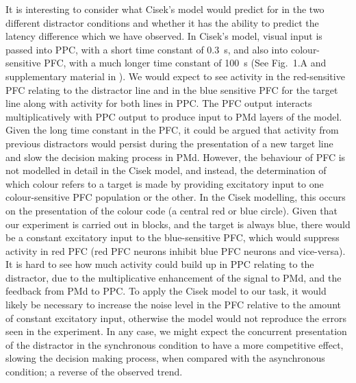 \documentclass[10pt,letterpaper]{article}
\begin{document}
It is interesting to consider what Cisek's model would predict for in
the two different distractor conditions and whether it has the ability
to predict the latency difference which we have observed. In Cisek's
model, visual input is passed into PPC, with a short time constant of
0.3~s, and also into colour-sensitive PFC, with a much longer time
constant of 100~s (See Fig.~1.A and supplementary material in
\cite{cisek_integrated_2006}). We would expect to see activity in the
red-sensitive PFC relating to the distractor line and in the blue
sensitive PFC for the target line along with activity for both lines
in PPC. The PFC output interacts multiplicatively with PPC output to
produce input to PMd layers of the model. Given the long time constant
in the PFC, it could be argued that activity from previous distractors
would persist during the presentation of a new target line and slow
the decision making process in PMd. However, the behaviour of PFC is
not modelled in detail in the Cisek model, and instead, the
determination of which colour refers to a target is made by providing
excitatory input to one colour-sensitive PFC population or the
other. In the Cisek modelling, this occurs on the presentation of the
colour code (a central red or blue circle). Given that our experiment
is carried out in blocks, and the target is always blue, there would
be a constant excitatory input to the blue-sensitive PFC, which would
suppress activity in red PFC (red PFC neurons inhibit blue PFC neurons
and vice-versa). It is hard to see how much activity could build up in
PPC relating to the distractor, due to the multiplicative enhancement
of the signal to PMd, and the feedback from PMd to PPC. To apply the
Cisek model to our task, it would likely be necessary to increase the
noise level in the PFC relative to the amount of constant excitatory
input, otherwise the model would not reproduce the errors seen in the
experiment. In any case, we might expect the concurrent presentation
of the distractor in the synchronous condition to have a more
competitive effect, slowing the decision making process, when compared
with the asynchronous condition; a reverse of the observed trend.
\end{document}

